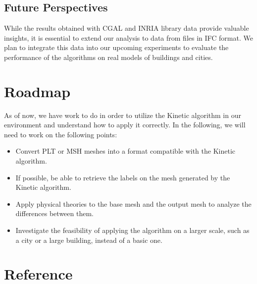 \documentclass{article}
\begin{document}
\subsection*{Future Perspectives}

    While the results obtained with CGAL and INRIA library data provide valuable insights, it is essential to extend our analysis to data from files in IFC format. We plan to integrate this data into our upcoming experiments to evaluate the performance of the algorithms on real models of buildings and cities.
    
\section{Roadmap}
As of now, we have work to do in order to utilize the Kinetic algorithm in our environment and understand how to apply it correctly. In the following, we will need to work on the following points:
\begin{itemize}
  \item Convert PLT or MSH meshes into a format compatible with the Kinetic algorithm.
  \item If possible, be able to retrieve the labels on the mesh generated by the Kinetic algorithm.
  \item Apply physical theories to the base mesh and the output mesh to analyze the differences between them.
  \item Investigate the feasibility of applying the algorithm on a larger scale, such as a city or a large building, instead of a basic one.
\end{itemize}

    
\nocite{*}
\section{Reference}


\end{document}
